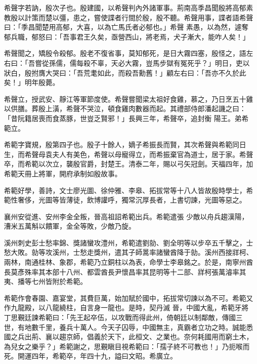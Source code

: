 \begin{pinyinscope}
 希聲字若訥，殷次子也。殷建國，以希聲判內外諸軍事。荊南高季昌聞殷將高郁素教殷以計策而楚以彊，患之，嘗使諜者行間於殷，殷不聽。希聲用事，諜者語希聲曰：「季昌聞楚用高郁，大喜，以為亡馬氏者必郁也。」希聲
 素愚，以為然，遽奪郁兵職，郁怒曰：「吾事君王久矣，亟營西山，將老焉，犬子漸大，能咋人矣！」



 希聲聞之，矯殷令殺郁。殷老不復省事，莫知郁死，是日大霧四塞，殷怪之，語左右曰：「吾嘗從孫儒，儒每殺不辜，天必大霧，豈馬步獄有冤死乎？」明日，吏以狀白，殷拊膺大哭曰：「吾荒耄如此，而殺吾勳舊！」顧左右曰：「吾亦不久於此矣！」明年殷薨。



 希聲立，授武安、靜江等軍節度使。希聲嘗聞梁太祖好食雞，慕之，乃日烹五十雞以供膳。葬殷上潢，希聲不哭泣，頓食雞肉數器而起。其禮部侍郎潘起譏之曰：「昔阮籍居喪而食蒸豚，世豈乏賢邪！」長興三年，希聲卒，追封衡
 陽王。弟希範立。



 希範字寶規，殷第四子也。殷子十餘人，嫡子希振長而賢，其次希聲與希範同日生，而希聲母袁夫人有美色，希聲以母寵得立，而希振棄官為道士，居于家。希聲卒，而希範以次立，襲殷官爵，封楚王。清泰二年，賜以弓矢冠劍。天福四年，加希範天冊上將軍，開府承制如殷故事。



 希範好學，善詩，文士廖光圖、徐仲雅、李皋、拓拔常等十八人皆故殷時學士，希範性奢侈，光圖等皆薄徒，飲博讙呼，獨常沉厚長者，上書切諫，光圖等惡之。



 襄州安從進、安州李金全叛，晉高祖詔希範出兵。希範遣張
 少敵以舟兵趨漢陽，漕米五萬斛以饋軍，金全等敗，少敵乃旋。



 溪州刺史彭士愁率錦、獎諸蠻攻澧州，希範遣劉勍、劉全明等以步卒五千擊之，士愁大敗。勍等攻溪州，士愁走獎州，遣其子師暠率諸蠻酋降于勍。溪州西接牂柯、兩林，南通桂林、象郡，希範乃立銅柱以為表，命學士李皋銘之。於是，南寧州酋長莫彥殊率其本部十八州、都雲酋長尹懷昌率其昆明等十二部、牂柯張萬濬率其夷、播等七州皆附於希範。



 希範作會春園、嘉宴堂，其費巨萬，始加賦於國中，拓拔常切諫以為不可。希範又作九龍殿，以八龍繞柱，自言身一龍也。是時，契丹滅
 晉，中國大亂，希範牙將丁思覲廷諫希範曰：「先王起卒伍，以攻戰而得此州，倚朝廷以制鄰敵，傳國三世，有地數千里，養兵十萬人。今天子囚辱，中國無主，真霸者立功之時。誠能悉國之兵出荊、襄以趨京師，倡義於天下，此桓文、之業也。奈何耗國用而窮土木，為兒女之樂乎？」希範謝之，思覲瞋目視希範曰：「孺子終不可教也！」乃扼喉而死。開運四年，希範卒，年四十九，謚曰文昭。希廣立。




\end{pinyinscope}
